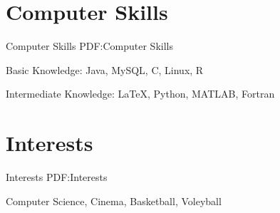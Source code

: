 \documentclass[letterpaper,10pt,oneside]{article}
\begin{document}
\begin{body}
\section
{Computer Skills}
{Computer Skills}
{PDF:Computer Skills}

\BulletItem
Basic Knowledge: Java, MySQL, C, Linux, R

\GapNoBreak
\BulletItem
Intermediate Knowledge: {\LaTeX}, Python, MATLAB, Fortran


\section
{Interests}
{Interests}
{PDF:Interests}

Computer Science, Cinema, Basketball, Voleyball
\end{body}
\label{LastPage}~
\end{document}
